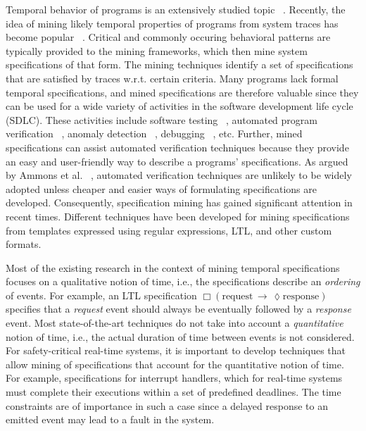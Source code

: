 \documentclass[]{sigplanconf}
\begin{document}
Temporal behavior of programs is an extensively studied topic ~\cite{lamport1978time, dwyer1999patterns}. %
Recently, the idea of mining likely temporal properties of programs from system traces has become popular ~\cite{lemieux2015general}.
Critical and commonly occuring behavioral patterns are typically provided to the mining frameworks, which then mine system specifications of that form. The mining techniques identify a set of specifications that are satisfied by traces w.r.t. certain criteria.
Many programs lack formal temporal specifications, and mined specifications are therefore valuable since they can be used for a wide variety of activities in the software development life cycle (SDLC).
These activities include software testing ~\cite{dallmeier2010generating}, automated program verification ~\cite{kincaid2015automated}, anomaly detection ~\cite{christodorescu2008mining}, debugging ~\cite{gabel2010online}, etc.
Further, mined specifications can assist automated verification techniques because they provide an easy and user-friendly way to describe a programs' specifications. As argued by Ammons et al. ~\cite{DBLP:conf/popl/AmmonsBL02}, automated verification techniques are unlikely to be widely adopted unless cheaper and easier ways of formulating specifications are developed.
Consequently, specification mining has gained significant attention in recent times. Different techniques have been developed for mining specifications from templates expressed using regular expressions, LTL, and other custom formats.

Most of the existing research in the context of mining temporal specifications focuses on a qualitative notion of time, i.e., the specifications describe an \emph{ordering} of events. For example, an LTL specification $\Box(\mathrm{request}\,\rightarrow\,\lozenge \mathrm{response})$ specifies that a \emph{request} event should always be eventually followed by a \emph{response} event. Most state-of-the-art techniques do not take into account a \emph{quantitative} notion of time, i.e., the actual duration of time between events is not considered.
For safety-critical real-time systems, it is important to develop techniques that allow mining of specifications that account for the quantitative notion of time.
For example, specifications for interrupt handlers, which for real-time systems must complete their executions within a set of predefined deadlines. The time constraints are of importance in such a case since a delayed response to an emitted event may lead to a fault in the system.
\end{document}

